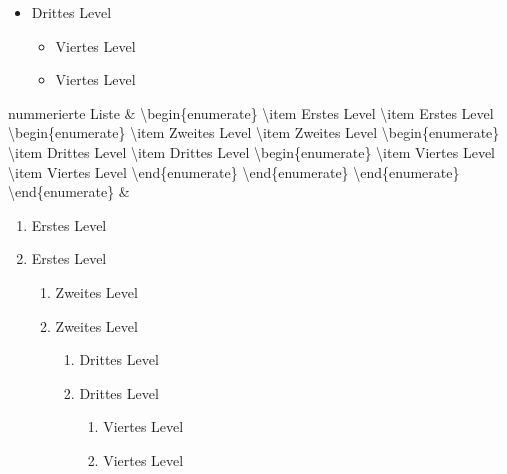 {\begin{longtabu}
\begin{minipage}[t]{0.45\textwidth}
\begin{itemize}
\begin{itemize}
\begin{itemize}
\item Drittes Level%
\begin{itemize}%
\item Viertes Level%
\item Viertes Level%
\end{itemize}%
\end{itemize}%
\end{itemize}%
\end{itemize}%
\end{minipage}\tabularnewline%
nummerierte Liste%
&%
\textbackslash begin\{enumerate\}\newline%
\textbackslash item Erstes Level\newline%
\textbackslash item Erstes Level\newline%
\textbackslash begin\{enumerate\}\newline%
\textbackslash item Zweites Level\newline%
\textbackslash item Zweites Level\newline%
\textbackslash begin\{enumerate\}\newline%
\textbackslash item Drittes Level\newline%
\textbackslash item Drittes Level\newline%
\textbackslash begin\{enumerate\}\newline%
\textbackslash item Viertes Level\newline%
\textbackslash item Viertes Level\newline%
\textbackslash end\{enumerate\}\newline%
\textbackslash end\{enumerate\}\newline%
\textbackslash end\{enumerate\}\newline%
\textbackslash end\{enumerate\}%
&%
\begin{minipage}[t]{0.45\textwidth}%
\begin{enumerate}%
\item Erstes Level%
\item Erstes Level%
\begin{enumerate}%
\item Zweites Level%
\item Zweites Level%
\begin{enumerate}%
\item Drittes Level%
\item Drittes Level%
\begin{enumerate}%
\item Viertes Level%
\item Viertes Level%
\end{enumerate}%
\end{enumerate}%
\end{enumerate}%
\end{enumerate}%
\end{minipage}\tabularnewline%
\bottomrule%
\end{longtabu}%
}%
%
